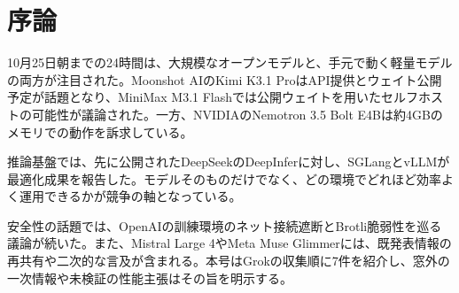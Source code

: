 \section*{序論}
10月25日朝までの24時間は、大規模なオープンモデルと、手元で動く軽量モデルの両方が注目された。Moonshot AIのKimi K3.1 ProはAPI提供とウェイト公開予定が話題となり、MiniMax M3.1 Flashでは公開ウェイトを用いたセルフホストの可能性が議論された。一方、NVIDIAのNemotron 3.5 Bolt E4Bは約4GBのメモリでの動作を訴求している。

推論基盤では、先に公開されたDeepSeekのDeepInferに対し、SGLangとvLLMが最適化成果を報告した。モデルそのものだけでなく、どの環境でどれほど効率よく運用できるかが競争の軸となっている。

安全性の話題では、OpenAIの訓練環境のネット接続遮断とBrotli脆弱性を巡る議論が続いた。また、Mistral Large 4やMeta Muse Glimmerには、既発表情報の再共有や二次的な言及が含まれる。本号はGrokの収集順に7件を紹介し、窓外の一次情報や未検証の性能主張はその旨を明示する。
